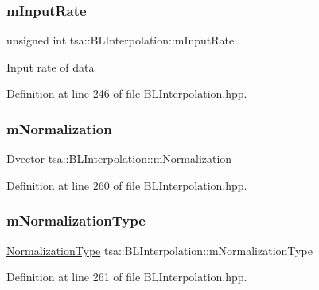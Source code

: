 \subsubsection{\texorpdfstring{m\+Input\+Rate}{mInputRate}}
{\footnotesize\ttfamily unsigned int tsa\+::\+B\+L\+Interpolation\+::m\+Input\+Rate\hspace{0.3cm}{\ttfamily [private]}}

Input rate of data 

Definition at line 246 of file B\+L\+Interpolation.\+hpp.

\mbox{\label{classtsa_1_1_b_l_interpolation_a5390ed81fda1345890543a95ab91a6e2}} 
\subsubsection{\texorpdfstring{m\+Normalization}{mNormalization}}
{\footnotesize\ttfamily \hyperlink{namespacetsa_a8900fb03d849baf447a1a0efe2561fb2}{Dvector} tsa\+::\+B\+L\+Interpolation\+::m\+Normalization\hspace{0.3cm}{\ttfamily [private]}}



Definition at line 260 of file B\+L\+Interpolation.\+hpp.

\mbox{\label{classtsa_1_1_b_l_interpolation_aa41a64576f7c0df22870378780d8f73d}} 
\subsubsection{\texorpdfstring{m\+Normalization\+Type}{mNormalizationType}}
{\footnotesize\ttfamily \hyperlink{classtsa_1_1_b_l_interpolation_ae11719d30e353da11f076289b87c7b1d}{Normalization\+Type} tsa\+::\+B\+L\+Interpolation\+::m\+Normalization\+Type\hspace{0.3cm}{\ttfamily [private]}}



Definition at line 261 of file B\+L\+Interpolation.\+hpp.

